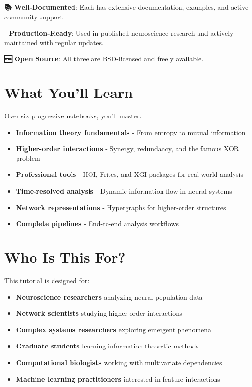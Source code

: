 \documentclass[
  11pt,
  letterpaper,
  oneside,
  openany]{book}
\providecommand{\tightlist}{%
  \setlength{\itemsep}{0pt}\setlength{\parskip}{0pt}}
\begin{document}
\textbf{📚 Well-Documented}: Each has extensive documentation, examples,
and active community support.

\textbf{🚀 Production-Ready}: Used in published neuroscience research
and actively maintained with regular updates.

\textbf{🆓 Open Source}: All three are BSD-licensed and freely
available.

\section*{What You'll Learn}\label{what-youll-learn}


Over six progressive notebooks, you'll master:

\begin{itemize}
\tightlist
\item
  \textbf{Information theory fundamentals} - From entropy to mutual
  information
\item
  \textbf{Higher-order interactions} - Synergy, redundancy, and the
  famous XOR problem
\item
  \textbf{Professional tools} - HOI, Frites, and XGI packages for
  real-world analysis
\item
  \textbf{Time-resolved analysis} - Dynamic information flow in neural
  systems
\item
  \textbf{Network representations} - Hypergraphs for higher-order
  structures
\item
  \textbf{Complete pipelines} - End-to-end analysis workflows
\end{itemize}

\section*{Who Is This For?}\label{who-is-this-for}


This tutorial is designed for:

\begin{itemize}
\tightlist
\item
  \textbf{Neuroscience researchers} analyzing neural population data
\item
  \textbf{Network scientists} studying higher-order interactions
\item
  \textbf{Complex systems researchers} exploring emergent phenomena
\item
  \textbf{Graduate students} learning information-theoretic methods
\item
  \textbf{Computational biologists} working with multivariate
  dependencies
\item
  \textbf{Machine learning practitioners} interested in feature
  interactions
\end{itemize}
\end{document}
